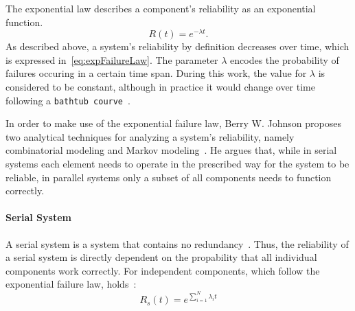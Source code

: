 The exponential law describes a component's reliability as an exponential function.
\begin{equation}
R(t) = e^{-\lambda t}.
\label{eq:expFailureLaw}
\end{equation}
As described above, a system's reliability by definition decreases over time, which is expressed in~\autoref{eq:expFailureLaw}.
The parameter $\lambda$ encodes the probability of failures occuring in a certain time span.
During this work, the value for $\lambda$ is considered to be constant, although in practice it would change over time following a \texttt{bathtub courve}~\cite{GeffroyMotetDependableComputing}.

In order to make use of the exponential failure law, Berry W. Johnson proposes two analytical techniques for analyzing a system's reliability, namely combinatorial modeling and Markov modeling~\cite{BarryFaultToleranceAnalysis}.
He argues that, while in serial systems each element needs to operate in the prescribed way for the system to be reliable, in parallel systems only a subset of all components needs to function correctly.

\paragraph{Serial System}
A serial system is a system that contains no redundancy~\cite{BarryFaultToleranceAnalysis}.
Thus, the reliability of a serial system is directly dependent on the propability that all individual components work correctly.
For independent components, which follow the exponential failure law, holds~\cite{BarryFaultToleranceAnalysis}:
\begin{equation}
R_s(t) = e^{\sum_{i = 1}^N \lambda_i t}
\label{eq:combReliabSerial}
\end{equation}

